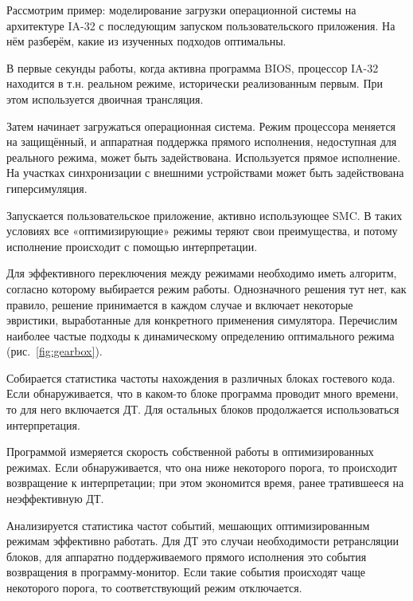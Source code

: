 Рассмотрим пример: моделирование загрузки операционной системы на архитектуре IA-32 с последующим запуском пользовательского приложения. На нём разберём, какие из изученных подходов оптимальны.
 
\begin{itemize*}
\item В первые секунды работы, когда активна программа BIOS, процессор IA-32 находится в т.н. реальном режиме, исторически реализованным первым. При этом используется двоичная трансляция. 

\item Затем начинает загружаться операционная система. Режим процессора меняется на защищённый, и аппаратная поддержка прямого исполнения, недоступная для реального режима, может быть задействована. Используется прямое исполнение. На участках синхронизации с внешними устройствами может быть задействована гиперсимуляция.

\item Запускается пользовательское приложение, активно использующее SMC. В таких условиях все «оптимизирующие» режимы теряют свои преимущества, и потому исполнение происходит с помощью интерпретации.

\end{itemize*}

Для эффективного переключения между режимами необходимо иметь алгоритм, согласно которому выбирается режим работы. Однозначного решения тут нет, как правило, решение принимается в каждом случае и включает некоторые эвристики, выработанные для конкретного применения симулятора. Перечислим наиболее частые подходы к динамическому определению оптимального режима (рис.~\ref{fig:gearbox}).

\begin{itemize*}
\item Собирается статистика частоты нахождения в различных блоках гостевого кода. Если обнаруживается, что в каком-то блоке программа проводит много времени, то для него включается ДТ. Для остальных блоков продолжается использоваться интерпретация.

\item Программой измеряется скорость собственной работы в оптимизированных режимах. Если обнаруживается, что она ниже некоторого порога, то происходит  возвращение к интерпретации; при этом экономится время, ранее тратившееся на неэффективную ДТ.

\item Анализируется статистика частот событий, мешающих оптимизированным режимам эффективно работать. Для ДТ это случаи необходимости ретрансляции блоков, для аппаратно поддерживаемого прямого исполнения это события возвращения в программу-монитор. Если такие события происходят чаще некоторого порога, то соответствующий режим отключается.
\end{itemize*}


